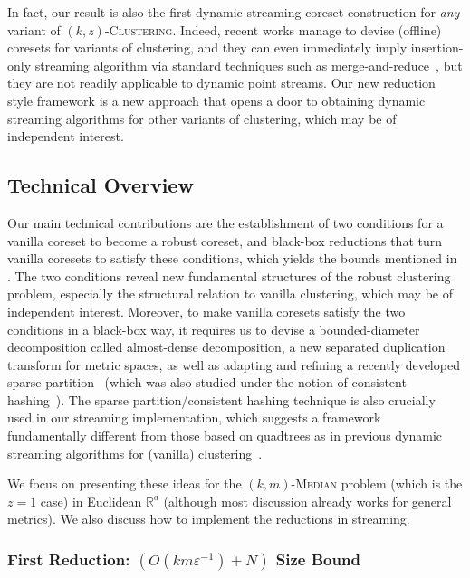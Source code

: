 \documentclass[letterpaper,11pt]{article}
\theoremstyle{plain}
\theoremstyle{definition}
\theoremstyle{remark}
\newcommand{\eps}{\varepsilon}
\newcommand{\ProblemName}[1]{\textsc{#1}}
\newcommand{\kzC}{\ProblemName{$(k,z)$-Clustering}\xspace}
\newcommand{\kRMedian}{\ProblemName{$(k,m)$-Median}\xspace}
\begin{document}
In fact, our result is also the first dynamic streaming coreset construction for \emph{any} variant of \kzC.
Indeed, recent works manage to devise (offline) coresets for variants of clustering,
and they can even immediately imply insertion-only streaming algorithm via standard techniques such as merge-and-reduce~\cite{DBLP:conf/stoc/Har-PeledM04},
but they are not readily applicable to dynamic point streams.
Our new reduction style framework is a new approach that opens a door to obtaining dynamic streaming algorithms for other variants of clustering,
which may be of independent interest.



 \subsection{Technical Overview}
\label{sec:tech_overview}

Our main technical contributions are the establishment of two conditions for a vanilla coreset to become a robust coreset,
and black-box reductions that turn vanilla coresets to satisfy these conditions,
which yields the bounds mentioned in .
The two conditions reveal new fundamental structures of the robust clustering problem, especially the structural relation to vanilla clustering,
which may be of independent interest.
Moreover, to make vanilla coresets satisfy the two conditions in a black-box way,
it requires us to devise a bounded-diameter decomposition called almost-dense decomposition,
a new separated duplication transform for metric spaces,
as well as adapting and refining a recently developed sparse partition~\cite{Jia05Universal,DBLP:conf/icalp/Filtser20} (which was also studied under the notion of consistent hashing~\cite{arxiv.2204.02095}).
The sparse partition/consistent hashing technique is also crucially used in our streaming implementation,
which suggests a framework fundamentally different from those based on quadtrees as in previous dynamic streaming algorithms for (vanilla) clustering~\cite{Braverman2017Clustering,Song2018Nearly}.

We focus on presenting these ideas for the \kRMedian problem (which is the $z = 1$ case) in Euclidean $\mathbb{R}^d$ (although most discussion already works for general metrics).
We also discuss how to implement the reductions in streaming.





\subsubsection{First Reduction: $\left(O(km\eps^{-1}) + N\right)$ Size Bound}
\label{sec:first_overview}
\end{document}
